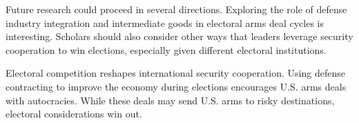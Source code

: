 \documentclass[12pt]{article}
\begin{document}
Future research could proceed in several directions. 
Exploring the role of defense industry integration and intermediate goods in electoral arms deal cycles is interesting.
Scholars should also consider other ways that leaders leverage security cooperation to win elections, especially given different electoral institutions. 


Electoral competition reshapes international security cooperation.
Using defense contracting to improve the economy during elections encourages U.S. arms deals with autocracies.
While these deals may send U.S. arms to risky destinations, electoral considerations win out. 


 
 
\end{document}
